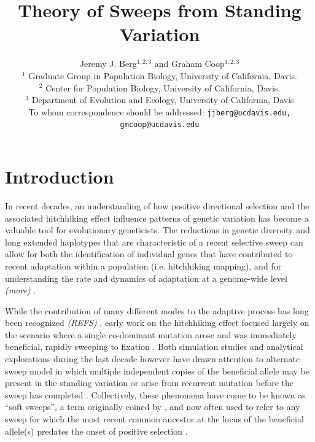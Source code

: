 \documentclass[a4paper,10pt]{article}
\title{Theory of Sweeps from Standing Variation}
\author{
Jeremy J. Berg$^{1,2,3}$ and Graham Coop$^{1,2,3}$ \\
$^1$ Graduate Group in Population Biology, University of California, Davis. \\
$^2$ Center for Population Biology, University of California, Davis.\\
$^3$ Department of Evolution and Ecology, University of California, Davis\\
\small To whom correspondence should be addressed: \texttt{jjberg@ucdavis.edu, gmcoop@ucdavis.edu}\\
}
\date{}
\newcommand{\jb}[1]{{\it\color{blue} (#1)} }
\begin{document}
\maketitle

\begin{abstract}
\end{abstract}

\section{Introduction}

In recent decades, an understanding of how positive directional selection and the associated hitchhiking effect influence patterns of genetic variation has become a valuable tool for evolutionary geneticists. The reductions in genetic diversity and long extended haplotypes that are characteristic of a recent selective sweep can allow for both the identification of individual genes that have contributed to recent adaptation within a population (i.e. hitchhiking mapping), and for understanding the rate and dynamics of adaptation at a genome-wide level \citep{Wiehe:1993th,Andolfatto:2007cq,EyreWalker:2009fq,Elyashiv:2014uc} \jb{more}.

While the contribution of many different modes to the adaptive process has long been recognized \jb{REFS}, early work on the hitchhiking effect focused largely on the scenario where a single co-dominant mutation arose and was immediately beneficial, rapidly sweeping to fixation \citep{Smith1974,Kaplan1989}. Both simulation studies and analytical explorations during the last decade however have drawn attention to alternate sweep model in which multiple independent copies of the beneficial allele may be present in the standing variation or arise from recurrent mutation before the sweep has completed \citep{Innan:2004bk,Przeworski2005,Hermisson2005,Pennings2006a,Pennings2006,Hermisson2008,BARRETT:2008cs,Ralph2010,Pokalyuk2012,Roesti:2014gp,Wilson:2014ke}. Collectively, these phenomena have come to be known as ``soft sweeps'', a term originally coined by \cite{Hermisson2005}, and now often used to refer to any sweep for which the most recent common ancestor at the locus of the beneficial allele(s) predates the onset of positive selection \citep{Messer:2013kh}.
\end{document}
